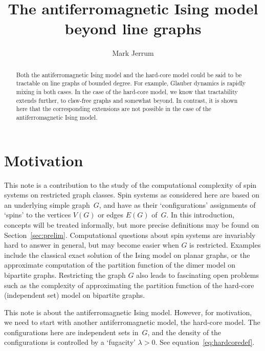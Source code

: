 \documentclass[11pt]{amsart}
\title[The antiferromagnetic Ising model beyond line graphs]{The antiferromagnetic Ising model\\ beyond line graphs}\thanks{Work partly supported by grant UKRI2771: Zeros, Algorithms, and Correlation for Graph Polynomials.}
\author{Mark Jerrum}
\begin{document}
\maketitle

\begin{abstract}
Both the antiferromagnetic Ising model and the hard-core model could be said to be tractable on line graphs of bounded degree.  For example, Glauber dynamics is rapidly mixing in both cases.  In the case of the hard-core model, we know that tractability extends further, to claw-free graphs and somewhat beyond.  In contrast, it is shown here that the corresponding extensions are not possible in the case of the antiferromagnetic Ising model.
\end{abstract}

\section{Motivation}

This note is a contribution to the study of the computational complexity of spin systems on restricted graph classes.  Spin systems as considered here are based on an underlying simple graph~$G$, and have as their `configurations' assignments of `spins' to the vertices $V(G)$ or edges $E(G)$ of~$G$.  In this introduction, concepts will be treated informally, but more precise definitions may be found on Section~\ref{sec:prelim}.  Computational questions about spin systems are invariably hard to answer in general, but may become easier when $G$ is restricted.  Examples include the classical exact solution of the Ising model on planar graphs, or the approximate computation of the partition function of the dimer model on bipartite graphs.  Restricting the graph $G$ also leads to fascinating open problems such as the complexity of approximating the partition function of the hard-core (independent set) model on bipartite graphs.

This note is about the antiferromagnetic Ising model.  However, for motivation, we need to start with another antiferromagnetic model, the hard-core model.  The configurations here are independent sets in~$G$, and the density of the configurations is controlled by a `fugacity' $\lambda>0$. See equation~\eqref{eq:hardcoredef}.
\end{document}
